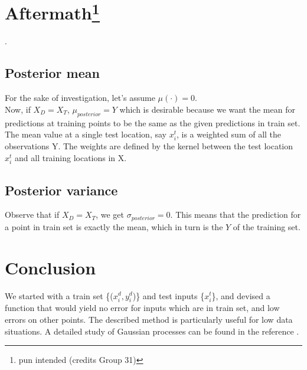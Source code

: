 \documentclass[12pt]{article}
\begin{document}
\section{Aftermath\footnote{pun intended (credits Group 31)}}.
\subsection{Posterior mean}
For the sake of investigation, let's assume $\mu(\cdot) = 0$. \\
Now, if $X_{D} = X_{T}$, $\mu_{posterior} = Y$ which is desirable because we want the mean for predictions at training points to be the same as the given predictions in train set. The mean value at a single test location, say $x_{i}^{t}$, is a weighted sum of all the observations Y. The weights are defined by the kernel between the test location $x_{i}^{t}$ and all training locations in X.

\subsection{Posterior variance}
Observe that if $X_{D} = X_{T}$, we get $\sigma_{posterior} = 0$. This means that the prediction for a point in train set is exactly the mean, which in turn is the $Y$ of the training set. 



\section{Conclusion}
We started with a train set \{($x^{d}_i, y^{d}_i$)\} and test inputs \{$x^{t}_{i}$\}, and devised a function that would yield no error for inputs which are in train set, and low errors on other points. The described method is particularly useful for low data situations. A detailed study of Gaussian processes can be found in the reference \cite{gaussianprocessmachinelearning}.

\clearpage

%
\printbibliography      


\end{document}
